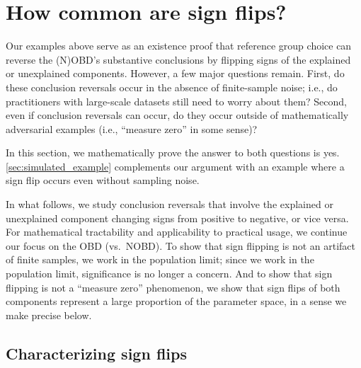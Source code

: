 \section{How common are sign flips?} 
\label{sec:signflips}

Our examples above serve as an existence proof that reference group choice can reverse the (N)OBD's substantive conclusions by flipping signs of the explained or unexplained components.
However, a few major questions remain.
First, do these conclusion reversals occur in the absence of finite-sample noise; i.e., do practitioners with large-scale datasets still need to worry about them?
Second, even if conclusion reversals can occur, do they occur outside of mathematically adversarial examples (i.e., ``measure zero'' in some sense)?

In this section, we mathematically prove the answer to both questions is yes.
\cref{sec:simulated_example} complements our argument with an example where a sign flip occurs even without sampling noise.

In what follows, we study conclusion reversals that involve the explained or unexplained component changing signs from positive to negative, or vice versa.
For mathematical tractability and applicability to practical usage, we continue our focus on the OBD (vs.\ NOBD). %
To show that sign flipping is not an artifact of finite samples, we work in the population limit; since we work in the population limit, significance is no longer a concern.
And to show that sign flipping is not a ``measure zero'' phenomenon, we show that sign flips of both components represent a large proportion of the parameter space, in a sense we make precise below.

\subsection{Characterizing sign flips}
\label{sec:sign_flip_characterizations}



